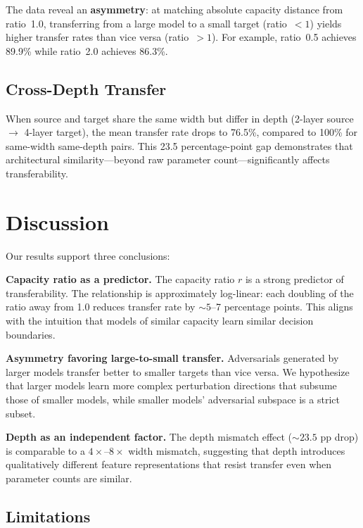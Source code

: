 \documentclass[11pt,a4paper]{article}
\begin{document}
The data reveal an \textbf{asymmetry}: at matching absolute capacity distance from ratio~1.0, transferring from a large model to a small target (ratio~$<1$) yields higher transfer rates than vice versa (ratio~$>1$). For example, ratio~0.5 achieves 89.9\% while ratio~2.0 achieves 86.3\%.

\subsection{Cross-Depth Transfer}

When source and target share the same width but differ in depth (2-layer source $\to$ 4-layer target), the mean transfer rate drops to 76.5\%, compared to 100\% for same-width same-depth pairs. This 23.5 percentage-point gap demonstrates that architectural similarity---beyond raw parameter count---significantly affects transferability.

\section{Discussion}

Our results support three conclusions:

\textbf{Capacity ratio as a predictor.} The capacity ratio $r$ is a strong predictor of transferability. The relationship is approximately log-linear: each doubling of the ratio away from 1.0 reduces transfer rate by ${\sim}5$--7 percentage points. This aligns with the intuition that models of similar capacity learn similar decision boundaries.

\textbf{Asymmetry favoring large-to-small transfer.} Adversarials generated by larger models transfer better to smaller targets than vice versa. We hypothesize that larger models learn more complex perturbation directions that subsume those of smaller models, while smaller models' adversarial subspace is a strict subset.

\textbf{Depth as an independent factor.} The depth mismatch effect (${\sim}23.5$ pp drop) is comparable to a $4\times$--$8\times$ width mismatch, suggesting that depth introduces qualitatively different feature representations that resist transfer even when parameter counts are similar.

\subsection{Limitations}
\end{document}
